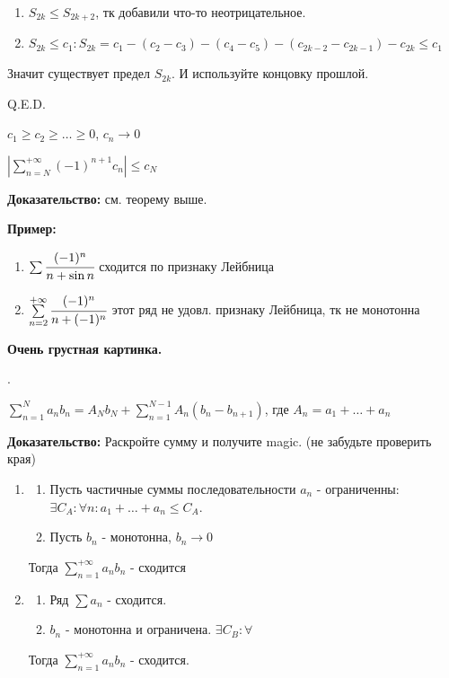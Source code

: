 \begin{enumerate}
    \item $S_{2k}\leq S_{2k+2}$, тк добавили что-то неотрицательное.
    \item $S_{2k}\leq c_1: S_{2k} = c_1-(c_2-c_3)-(c_4-c_5) - (c_{2k-2}-c_{2k-1})-c_{2k}\leq c_1$
\end{enumerate}

Значит существует предел $S_{2k}$. И используйте концовку прошлой.

\hfill Q.E.D.


$c_1\geq c_2 \geq \ldots \geq 0  $, $c_n\rightarrow 0 $

$|\sum\limits_{n=N}^{+\infty} (-1)^{n+1}c_n|\leq c_N$

\textbf{Доказательство:} см. теорему выше.

\textbf{Пример:}
\begin{enumerate}
    \item $\sum \cfrac{(-1)^n}{n + \sin n}$ сходится по признаку Лейбница
    \item $\sum\limits_{n=2}^{+\infty}\cfrac{(-1)^n}{n +(-1)^n}$ этот ряд не удовл. признаку Лейбница, тк не монотонна 
\end{enumerate}

\textbf{Очень грустная картинка.}

.

$\sum\limits_{n=1}^{N} a_n b_n = A_N b_N + \sum\limits_{n=1}^{N-1}A_n(b_n-b_{n+1})$, где $A_n = a_1 + \ldots + a_n$

\textbf{Доказательство:} Раскройте сумму и получите magic. (не забудьте проверить края)


\begin{enumerate}
    \item
    \begin{enumerate}
        \item  Пусть частичные суммы последовательности $a_n$ - ограниченны: $\exists C_A: \forall n: a_1 + \ldots + a_n \leq C_A$.
         \item Пусть $b_n$ - монотонна, $b_n\rightarrow 0 $
    
    \end{enumerate}
     Тогда $\sum\limits_{n=1}^{+\infty}a_nb_n$ - сходится
  
   \item
   \begin{enumerate}
       \item Ряд $\sum a_n$ - сходится.
        \item $b_n$ - монотонна и ограничена. $\exists C_B: \forall $
   \end{enumerate}
    Тогда $\sum\limits_{n=1}^{+\infty}a_nb_n$ - сходится.
   
\end{enumerate}

